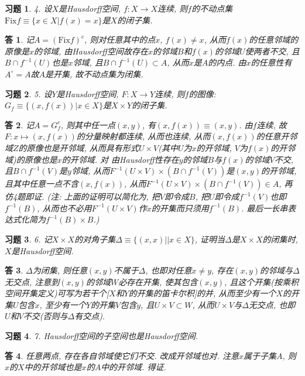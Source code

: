 \documentclass{ctexart}%
\newtheorem*{exercise}{习题}
\newtheorem*{solution}{答}
\theoremstyle{definition}
\theoremstyle{remark}
\begin{document}
\begin{exercise}4. 设$X$是Hausdorff空间, $f:X\rightarrow X$连续, 则$f$的不动点集$\text{Fix}f\equiv\{x\in X|f(x)=x\}$是$X$的闭子集.
\end{exercise}
\begin{solution}记$A=(\text{Fix}f)^c$, 则对任意其中的点$x$, $f(x)\neq x$, 从而$f(x)$的任意邻域的原像是$x$的邻域, 由Hausdorff空间故存在$x$的邻域$B$和$f(x)$的邻域$U$使两者不交, 且$B\cap f^{-1}(U)$也是$x$邻域, 且$B\cap f^{-1}(U)\subset A$, 从而$x$是$A$的内点. 由$x$的任意性有$A^\circ=A$故$A$是开集, 故不动点集为闭集. 
\end{solution}

\begin{exercise}5. 设$Y$是Hausdorff空间, $F: X\rightarrow Y$连续, 则$f$的图像: $G_f\equiv \{(x,f(x))|x\in X\}$是$X\times Y$的闭子集.
\end{exercise}
\begin{solution}记$A=G^c_f$, 则其中任一点$(x,y)$, 有$(x, f(x))\equiv (x,y)$. 由$f$连续, 故$F: x\mapsto (x,f(x))$的分量映射都连续, 从而也连续, 从而$(x, f(x))$的任意开邻域$Z$的原像也是开邻域, 从而具有形式$U\times V$(其中$U$为$x$的开邻域, $V$为$f(x)$的开邻域)的原像也是$x$的开邻域. 对
由Hausdorff性存在$y$的邻域$B$与$f(x)$的邻域$V$不交, 且$B\cap f^{-1}(V)$是$y$邻域, 从而$F^{-1}(U\times V)\times (B\cap f^{-1}(V))$是$(x,y)$的开邻域, 且其中任意一点不含$(x, f(x))$, 从而$F^{-1}(U\times V)\times (B\cap f^{-1}(V))\in A$, 再仿4题即证. (注: 上面的证明可以简化为, 把$V$即令成$B$, 把$U$即令成$f^{-1}(V)$也即$f^{-1}(B)$,  从而也不必用$F^{-1}(U\times V)$作$x$的开集而只须用$f^{-1}(B)$. 最后一长串表达式化简为$f^{-1}(B)\times B$.)
\end{solution}

\begin{exercise}6. 记$X\times X$的对角子集$\Delta\equiv \{(x,x)||x\in X\}$, 证明当$\Delta$是$X\times X$的闭集时, $X$是Hausdorff空间.
\end{exercise}
\begin{solution}$\Delta$为闭集, 则任意$(x,y)$不属于$\Delta$, 也即对任意$x\neq y$, 存在$(x,y)$的邻域与$\Delta$无交点, 注意到$(x,y)$的邻域$W$必存在开集, 使其包含$(x,y)$, 且这个开集(按乘积空间开集定义)可写为若干个[$X$和$Y$的开集的笛卡尔积]的并, 从而至少有一个$X$的开集$U$包含$x$, 至少有一个$Y$的开集$V$包含$y$, 且$U\times V \subset W$, 从而$U\times V$与$\Delta$无交点, 也即$U$和$V$不交(否则与$\Delta$有交点). 
\end{solution}

\begin{exercise}7. Hausdorff空间的子空间也是Hausdorff空间.
\end{exercise}
\begin{solution}任意两点, 存在各自邻域使它们不交. 改成开邻域也对. 注意$x$属于子集$A$, 则$x$的$X$中的开邻域也是$x$的$A$中的开邻域. 得证. 
\end{solution}
\end{document}
